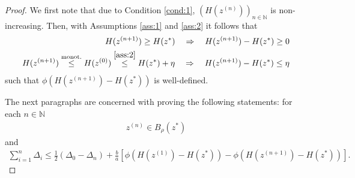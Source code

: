 \documentclass[onecolumn,final,a4paper,13pt,reqno]{siamart}
\begin{document}
\begin{proof}
	We first note that due to Condition \ref{cond:1}, $(H(z^{(n)}))_{n \in \mathbb{N}}$ is non-increasing. Then, with Assumptions \ref{ass:1} and \ref{ass:2} it follows that
	\begin{align}
		H(z^{(n + 1)}) \geq H(z^\ast) \quad\Rightarrow\quad H(z^{(n + 1)}) - H(z^\ast) \geq 0\\
		H(z^{(n + 1)}) \overset{\text{monot.}}{\leq} H(z^{(0)}) \overset{\ref{ass:2}}{\leq} H(z^\ast) + \eta\quad\Rightarrow \quad H(z^{(n + 1)}) - H(z^\ast) \leq \eta
	\end{align}
	such that $\phi(H(z^{(n + 1)}) - H(z^\ast))$ is well-defined.
	
	The next paragraphs are concerned with proving the following statements: for each $n \in \mathbb{N}$
	\begin{align}
		z^{(n)} \in B_\rho(z^\ast)\label{eq:lemma-claim-2}
	\end{align}
	and
	\begin{align}
		\sum_{i = 1}^n \Delta_i \leq \frac{1}{2} (\Delta_0 - \Delta_n) + \frac{b}{a} [\phi(H(z^{(1)}) - H(z^\ast)) - \phi(H(z^{(n + 1)}) - H(z^\ast))].\label{eq:lemma-claim-3}
	\end{align}
	

\end{proof}
\end{document}
